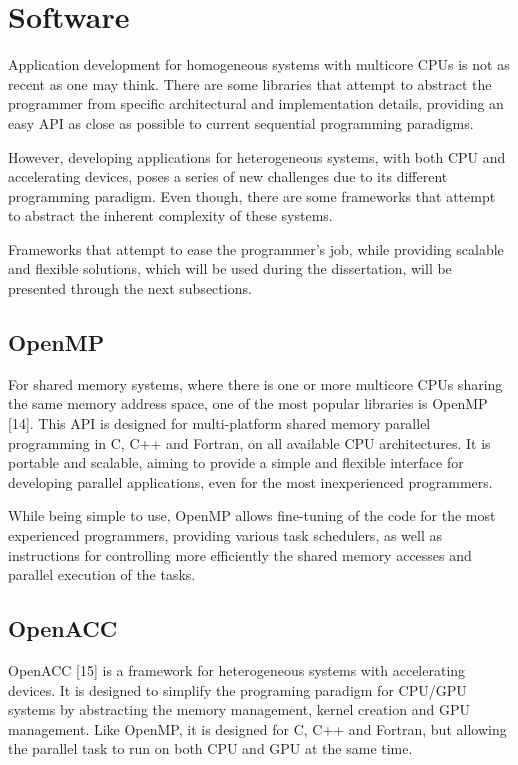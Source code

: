 \section{Software}

Application development for homogeneous systems with multicore CPUs is not as recent as one may think. There are some libraries that attempt to abstract the programmer from specific architectural and implementation details, providing an easy API as close as possible to current sequential programming paradigms.

However, developing applications for heterogeneous systems, with both CPU and accelerating devices, poses a series of new challenges due to its different programming paradigm. Even though, there are some frameworks that attempt to abstract the inherent complexity of these systems.

Frameworks that attempt to ease the programmer’s job, while providing scalable and flexible solutions, which will be used during the dissertation, will be presented through the next subsections.

\subsection{OpenMP}

For shared memory systems, where there is one or more multicore CPUs sharing the same memory address space, one of the most popular libraries is OpenMP [14]. This API is designed for multi-platform shared memory parallel programming in C, C++ and Fortran, on all available CPU architectures. It is portable and scalable, aiming to provide a simple and flexible interface for developing parallel applications, even for the most inexperienced programmers.

While being simple to use, OpenMP allows fine-tuning of the code for the most experienced programmers, providing various task schedulers, as well as instructions for controlling more efficiently the shared memory accesses and parallel execution of the tasks.

\subsection{OpenACC}

OpenACC [15] is a framework for heterogeneous systems with accelerating devices. It is designed to simplify the programing paradigm for CPU/GPU systems by abstracting the memory management, kernel creation and GPU management. Like OpenMP, it is designed for C, C++ and Fortran, but allowing the parallel task to run on both CPU and GPU at the same time.

